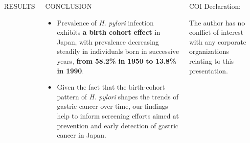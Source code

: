 \documentclass[english,xcolor=table,t
]{beamer}
\begin{document}
\begin{frame}
\begin{columns}
\begin{block}{RESULTS}
\end{block}

\begin{block}{CONCLUSION}

\begin{itemize}
\item
  Prevalence of \emph{H. pylori} infection exhibits \textbf{a birth
  cohort effect} in Japan, with prevalence decreasing steadily in
  individuals born in successive years, \textbf{from 58.2\% in 1950 to
  13.8\% in 1990}.
\item
  Given the fact that the birth-cohort pattern of \emph{H. pylori}
  shapes the trends of gastric cancer over time, our findings help to
  inform screening efforts aimed at prevention and early detection of
  gastric cancer in Japan.
\end{itemize}

\end{block}

\begin{block}{COI Declaration:}

The author has no conflict of interest with any corporate organizations
relating to this presentation.

\end{block}

\end{columns}

\end{frame}
\end{document}
